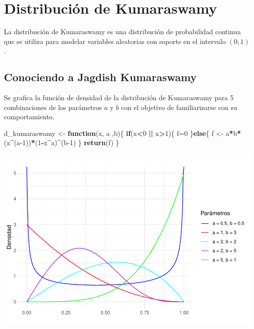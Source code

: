 \documentclass[
]{article}
\newenvironment{Shaded}{\begin{snugshade}}{\end{snugshade}}
\newcommand{\ControlFlowTok}[1]{\textcolor[rgb]{0.13,0.29,0.53}{\textbf{#1}}}
\newcommand{\DecValTok}[1]{\textcolor[rgb]{0.00,0.00,0.81}{#1}}
\newcommand{\FunctionTok}[1]{\textcolor[rgb]{0.13,0.29,0.53}{\textbf{#1}}}
\newcommand{\NormalTok}[1]{#1}
\newcommand{\OtherTok}[1]{\textcolor[rgb]{0.56,0.35,0.01}{#1}}
\newcommand{\SpecialCharTok}[1]{\textcolor[rgb]{0.81,0.36,0.00}{\textbf{#1}}}
\begin{document}
\newpage

\hypertarget{distribuciuxf3n-de-kumaraswamy}{%
\section{Distribución de
Kumaraswamy}\label{distribuciuxf3n-de-kumaraswamy}}

La distribución de Kumaraswamy es una distribución de probabilidad
continua que se utiliza para modelar variables aleatorias con soporte en
el intervalo \((0;1)\).

\hypertarget{conociendo-a-jagdish-kumaraswamy}{%
\subsection{Conociendo a Jagdish
Kumaraswamy}\label{conociendo-a-jagdish-kumaraswamy}}

Se grafica la función de densidad de la distribución de Kumaraswamy para
5 combinaciones de los parámetros \(a\) y \(b\) con el objetivo de
familiarizarse con su comportamiento.

\begin{Shaded}
\begin{Highlighting}[]
\NormalTok{d\_kumaraswamy }\OtherTok{\textless{}{-}} \ControlFlowTok{function}\NormalTok{(x, a ,b)\{}
  \ControlFlowTok{if}\NormalTok{(x}\SpecialCharTok{\textless{}}\DecValTok{0} \SpecialCharTok{||}\NormalTok{ x}\SpecialCharTok{\textgreater{}}\DecValTok{1}\NormalTok{)\{}
\NormalTok{    f}\OtherTok{=}\DecValTok{0}
\NormalTok{  \}}\ControlFlowTok{else}\NormalTok{\{}
\NormalTok{    f }\OtherTok{\textless{}{-}}\NormalTok{ a}\SpecialCharTok{*}\NormalTok{b}\SpecialCharTok{*}\NormalTok{(x}\SpecialCharTok{\^{}}\NormalTok{(a}\DecValTok{{-}1}\NormalTok{))}\SpecialCharTok{*}\NormalTok{(}\DecValTok{1}\SpecialCharTok{{-}}\NormalTok{x}\SpecialCharTok{\^{}}\NormalTok{a)}\SpecialCharTok{\^{}}\NormalTok{(b}\DecValTok{{-}1}\NormalTok{)}
\NormalTok{  \}}
  \FunctionTok{return}\NormalTok{(f)}
\NormalTok{\}}
\end{Highlighting}
\end{Shaded}

\begin{center}\includegraphics{informe2md_files/figure-latex/unnamed-chunk-5-1} \end{center}
\end{document}
